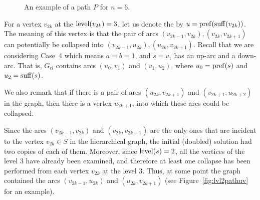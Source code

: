 \begin{figure}[ht]
\begin{center}

\end{center}

\caption{An example of a path $P$ for $n=6$.}\label{fig:lvl2path6}
\end{figure}

For a vertex $v_{2k}$ at the $\operatorname{level} (v_{2k}) = 3 $, let us denote the by $u=\operatorname{pref}(\operatorname{suff}(v_{2k}))$. The meaning of this vertex is that the pair of arcs $( v_{2k-1}, v_{2k}), (v_{2k}, v_{2k + 1})$ can potentially be collapsed into $( v_{2k-1}, u_{2k}), (u_{2k}, v_{2k + 1})$. Recall that we are considering Case~4 which means $a=b=1$, and $s=v_1$ has an up-arc and a down-arc. That is, $ G_{cl} $ contains arcs $ (u_0, v_1) $ and $ (v_1, u_2) $, where $ u_0 = \operatorname{pref} (s) $ and $ u_2 = \operatorname{suff} (s) $. 

We also remark that if there is a pair of arcs $ (u_{2k}, v_{2k + 1}) $ and $ (v_{2k + 1}, u_{2k + 2}) $ in the graph, then there is a vertex $ u_{2k + 1} $, into which these arcs could be collapsed.

Since the arcs $ (v_{2k-1}, v_{2k}) $ and $ (v_{2k} , v_{2k + 1}) $ are the only ones that are incident to the vertex $ v_{2k} \in S $ in the hierarchical graph, the initial (doubled) solution had two copies of each of them. Moreover, since $ \operatorname{level} (s) = 2 $, all the vertices of the level $ 3 $ have already been examined, and therefore at least one collapse has been performed from each vertex $ v_ {2k} $ at the level $ 3 $. Thus, at some point the graph contained the arcs $ (v_{2k-1} , u_{2k}) $ and $ (u_{2k}, v_{2k + 1}) $ (see Figure~\ref {fig:lvl2pathuv} for an example).

